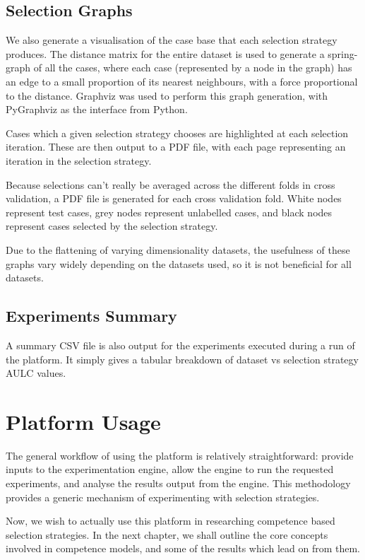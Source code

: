 \documentclass[a4paper,11pt]{report}
\begin{document}
\subsection{Selection Graphs\label{sec:selectiongraphs}}
We also generate a visualisation of the case base that each selection strategy produces. The distance matrix for the entire dataset is used to generate a spring-graph of all the cases, where each case (represented by a node in the graph) has an edge to a small proportion of its nearest neighbours, with a force proportional to the distance. Graphviz \citep{prog:graphviz} was used to perform this graph generation, with PyGraphviz \citep{prog:pygraphviz} as the interface from Python.

Cases which a given selection strategy chooses are highlighted at each selection iteration. These are then output to a PDF file, with each page representing an iteration in the selection strategy.

Because selections can't really be averaged across the different folds in cross validation, a PDF file is generated for each cross validation fold. White nodes represent test cases, grey nodes represent unlabelled cases, and black nodes represent cases selected by the selection strategy.

Due to the flattening of varying dimensionality datasets, the usefulness of these graphs vary widely depending on the datasets used, so it is not beneficial for all datasets.

\subsection{Experiments Summary}
A summary CSV file is also output for the experiments executed during a run of the platform. It simply gives a tabular breakdown of dataset vs selection strategy AULC values.

\section{Platform Usage}
The general workflow of using the platform is relatively straightforward: provide inputs to the experimentation engine, allow the engine to run the requested experiments, and analyse the results output from the engine. This methodology provides a generic mechanism of experimenting with selection strategies.

Now, we wish to actually use this platform in researching competence based selection strategies. In the next chapter, we shall outline the core concepts involved in competence models, and some of the results which lead on from them.
\end{document}
